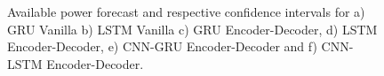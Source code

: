 \begin{figure}[h!]
\captionsetup[subfigure]{position=b}
\centering
{}

\caption{Available power forecast and respective confidence intervals for a) GRU Vanilla b) LSTM Vanilla c) GRU Encoder-Decoder, d) LSTM Encoder-Decoder, e) CNN-GRU Encoder-Decoder and f) CNN-LSTM Encoder-Decoder.}
\label{mtcdrop}
\end{figure}


